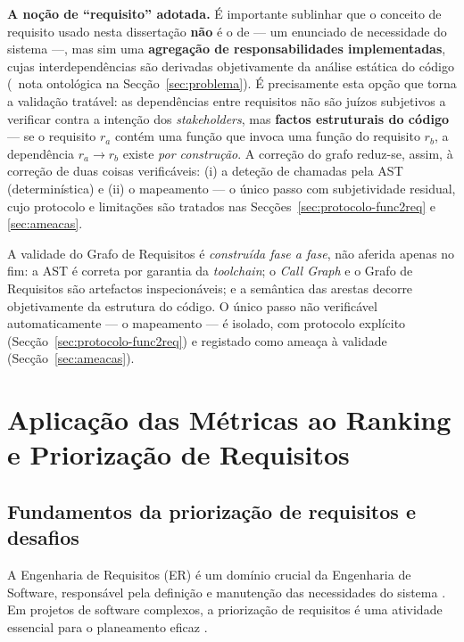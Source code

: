 \textbf{A noção de ``requisito'' adotada.} É importante sublinhar que
o conceito de requisito usado nesta dissertação \textbf{não} é o de
\citet{sommerville2007} --- um enunciado de necessidade do sistema ---,
mas sim uma \textbf{agregação de responsabilidades implementadas},
cujas interdependências são derivadas objetivamente da análise
estática do código (\cf\ nota ontológica na
Secção~\ref{sec:problema}). É precisamente esta opção que torna a
validação tratável: as dependências entre requisitos não são juízos
subjetivos a verificar contra a intenção dos \emph{stakeholders}, mas
\textbf{factos estruturais do código} --- se o requisito $r_a$ contém
uma função que invoca uma função do requisito $r_b$, a dependência
$r_a \rightarrow r_b$ existe \emph{por construção}. A correção do
grafo reduz-se, assim, à correção de duas coisas verificáveis: (i) a
deteção de chamadas pela AST (determinística) e (ii) o mapeamento
 --- o único passo com subjetividade residual,
cujo protocolo e limitações são tratados nas
Secções~\ref{sec:protocolo-func2req} e \ref{sec:ameacas}.

\begin{notebox}
    A validade do Grafo de Requisitos é \emph{construída fase a fase},
    não aferida apenas no fim: a AST é correta por garantia da
    \emph{toolchain}; o \emph{Call Graph} e o Grafo de Requisitos são
    artefactos inspecionáveis; e a semântica das arestas decorre
    objetivamente da estrutura do código. O único passo não
    verificável automaticamente --- o mapeamento 
    --- é isolado, com protocolo explícito
    (Secção~\ref{sec:protocolo-func2req}) e registado como ameaça à
    validade (Secção~\ref{sec:ameacas}).
\end{notebox}

\section{Aplicação das Métricas ao Ranking e Priorização de Requisitos}
\label{sec:re}

\subsection{Fundamentos da priorização de requisitos e desafios}
\label{sec:re-fundamentos}

A Engenharia de Requisitos (ER) é um domínio crucial da Engenharia de
Software, responsável pela definição e manutenção das necessidades do
sistema \parencite{sommerville2007}. Em projetos de software
complexos, a priorização de requisitos é uma atividade essencial para
o planeamento eficaz \parencite{karlsson2002, berander2005}.

